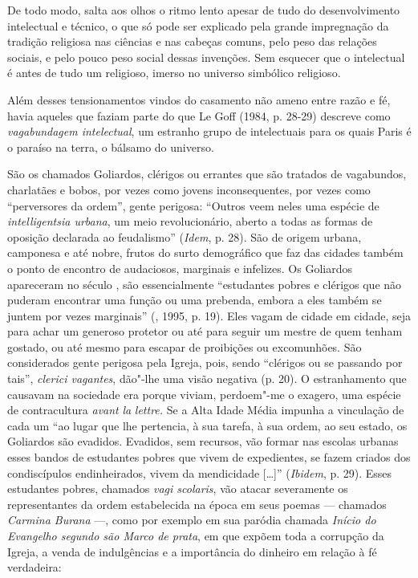 De todo modo, salta aos olhos o ritmo lento apesar de tudo do
desenvolvimento intelectual e técnico, o que só pode ser explicado pela
grande impregnação da tradição religiosa nas ciências e nas cabeças
comuns, pelo peso das relações sociais, e pelo pouco peso social dessas
invenções. Sem esquecer que o intelectual é antes de tudo um religioso,
imerso no universo simbólico religioso.

Além desses tensionamentos vindos do casamento não ameno entre razão e
fé, havia aqueles que faziam parte do que Le Goff (1984, p. 28-29)
descreve como \emph{vagabundagem intelectual}, um estranho grupo de
intelectuais para os quais Paris é o paraíso na terra, o bálsamo do
universo.

São os chamados Goliardos, clérigos ou errantes que são tratados de
vagabundos, charlatães e bobos, por vezes como jovens inconsequentes,
por vezes como ``perversores da ordem'', gente perigosa: ``Outros veem
neles uma espécie de \emph{intelligentsia urbana}, um meio
revolucionário, aberto a todas as formas de oposição declarada ao
feudalismo'' (\emph{Idem}, p. 28). São de origem urbana, camponesa e até
nobre, frutos do surto demográfico que faz das cidades também o ponto de
encontro de audaciosos, marginais e infelizes. Os Goliardos apareceram
no século , são essencialmente ``estudantes pobres e clérigos que não
puderam encontrar uma função ou uma prebenda, embora a eles também se
juntem por vezes marginais'' (, 1995, p. 19). Eles vagam de cidade
em cidade, seja para achar um generoso protetor ou até para seguir um
mestre de quem tenham gostado, ou até mesmo para escapar de proibições
ou excomunhões. São considerados gente perigosa pela Igreja, pois, sendo
``clérigos ou se passando por tais'', \emph{clerici vagantes}, dão"-lhe
uma visão negativa (p. 20). O estranhamento que causavam na
sociedade era porque viviam, perdoem"-me o exagero, uma espécie
de contracultura \emph{avant} \emph{la} \emph{lettre.} Se a Alta Idade
Média impunha a vinculação de cada um ``ao lugar que lhe pertencia, à
sua tarefa, à sua ordem, ao seu estado, os Goliardos são evadidos.
Evadidos, sem recursos, vão formar nas escolas urbanas esses bandos de
estudantes pobres que vivem de expedientes, se fazem criados dos
condiscípulos endinheirados, vivem da mendicidade [\ldots{}]''
(\emph{Ibidem}, p. 29). Esses estudantes pobres, chamados \emph{vagi
scolaris}, vão atacar severamente os representantes da ordem
estabelecida na época em seus poemas --- chamados \emph{Carmina Burana} ---, como por exemplo em sua paródia chamada \emph{Início do
Evangelho segundo são Marco de prata}, em que expõem toda a corrupção da
Igreja, a venda de indulgências e a importância do dinheiro em relação à
fé verdadeira:


